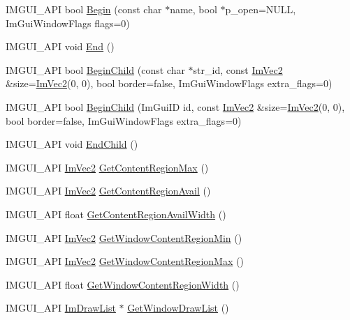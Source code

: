 \begin{DoxyCompactItemize}
\item 
I\+M\+G\+U\+I\+\_\+\+A\+PI bool \hyperlink{namespace_im_gui_a581e58db0bc930bafa4a5d23093a2b99}{Begin} (const char $\ast$name, bool $\ast$p\+\_\+open=N\+U\+LL, Im\+Gui\+Window\+Flags flags=0)
\item 
I\+M\+G\+U\+I\+\_\+\+A\+PI void \hyperlink{namespace_im_gui_a5479d93794a004c67ceb6d13f37c8254}{End} ()
\item 
I\+M\+G\+U\+I\+\_\+\+A\+PI bool \hyperlink{namespace_im_gui_a93b10a516e6da427b743906ad97d7f16}{Begin\+Child} (const char $\ast$str\+\_\+id, const \hyperlink{struct_im_vec2}{Im\+Vec2} \&size=\hyperlink{struct_im_vec2}{Im\+Vec2}(0, 0), bool border=false, Im\+Gui\+Window\+Flags extra\+\_\+flags=0)
\item 
I\+M\+G\+U\+I\+\_\+\+A\+PI bool \hyperlink{namespace_im_gui_a3320a3f36d9d8b227f93a015792379d3}{Begin\+Child} (Im\+Gui\+ID id, const \hyperlink{struct_im_vec2}{Im\+Vec2} \&size=\hyperlink{struct_im_vec2}{Im\+Vec2}(0, 0), bool border=false, Im\+Gui\+Window\+Flags extra\+\_\+flags=0)
\item 
I\+M\+G\+U\+I\+\_\+\+A\+PI void \hyperlink{namespace_im_gui_af8de559a88c1442d6df8c1b04c86e997}{End\+Child} ()
\item 
I\+M\+G\+U\+I\+\_\+\+A\+PI \hyperlink{struct_im_vec2}{Im\+Vec2} \hyperlink{namespace_im_gui_a0a4dbfabbfa45d74319ef541962ce2eb}{Get\+Content\+Region\+Max} ()
\item 
I\+M\+G\+U\+I\+\_\+\+A\+PI \hyperlink{struct_im_vec2}{Im\+Vec2} \hyperlink{namespace_im_gui_a410c8e19b2fea8b52746ca11b3930301}{Get\+Content\+Region\+Avail} ()
\item 
I\+M\+G\+U\+I\+\_\+\+A\+PI float \hyperlink{namespace_im_gui_a52e3311f46626a5d0369139d20da993a}{Get\+Content\+Region\+Avail\+Width} ()
\item 
I\+M\+G\+U\+I\+\_\+\+A\+PI \hyperlink{struct_im_vec2}{Im\+Vec2} \hyperlink{namespace_im_gui_a790123aa15c266798f35050ba36b7197}{Get\+Window\+Content\+Region\+Min} ()
\item 
I\+M\+G\+U\+I\+\_\+\+A\+PI \hyperlink{struct_im_vec2}{Im\+Vec2} \hyperlink{namespace_im_gui_a96ce6060592d3ef975594357e650adc6}{Get\+Window\+Content\+Region\+Max} ()
\item 
I\+M\+G\+U\+I\+\_\+\+A\+PI float \hyperlink{namespace_im_gui_a87c1de99e670bff87c43bfb07bbf898f}{Get\+Window\+Content\+Region\+Width} ()
\item 
I\+M\+G\+U\+I\+\_\+\+A\+PI \hyperlink{struct_im_draw_list}{Im\+Draw\+List} $\ast$ \hyperlink{namespace_im_gui_aa100c22a9feafe843fa12c66590cbda0}{Get\+Window\+Draw\+List} ()

\end{DoxyCompactItemize}
